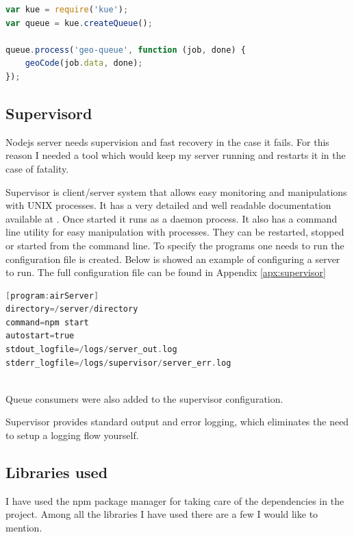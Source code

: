\documentclass[thesis=M,english]{FITthesis}[2012/10/20]
\begin{document}
\begin{lstlisting}[language=JavaScript]
var kue = require('kue');
var queue = kue.createQueue();

queue.process('geo-queue', function (job, done) {
    geoCode(job.data, done);
});

\end{lstlisting}

\subsection{Supervisord}
 
Nodejs server needs supervision and fast recovery in the case it fails. For this reason I needed a tool which would keep my server running and restarts it in the case of fatality.

Supervisor is client/server system that allows easy monitoring and manipulations with UNIX processes. It has a very detailed and well readable documentation available at \cite{supervisor}. Once started it runs as a daemon process. It also has a command line utility for easy manipulation with processes. They can be restarted, stopped or started from the command line. To specify the programs one needs to run the configuration file is created. Below is showed an example of configuring a server to run. The full configuration file can be found in Appendix \ref{apx:supervisor} \\

\begin{lstlisting}[language=C]
[program:airServer]
directory=/server/directory
command=npm start
autostart=true 
stdout_logfile=/logs/server_out.log
stderr_logfile=/logs/supervisor/server_err.log  
\end{lstlisting} \\
Queue consumers were also added to the supervisor configuration. 

Supervisor provides standard output and error logging, which eliminates the need to setup a logging flow yourself.

\subsection{Libraries used}

I have used the npm package manager for taking care of the dependencies in the project. Among all the libraries I have used there are a few I would like to mention.
\end{document}
